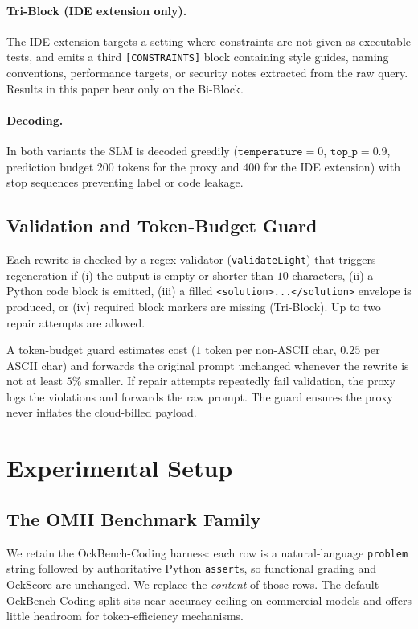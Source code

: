 \documentclass[11pt,a4paper,twocolumn]{article}
\begin{document}
\paragraph{Tri-Block (IDE extension only).} The IDE extension targets a setting where constraints are not given as executable tests, and emits a third \texttt{[CONSTRAINTS]} block containing style guides, naming conventions, performance targets, or security notes extracted from the raw query. Results in this paper bear only on the Bi-Block.

\paragraph{Decoding.} In both variants the SLM is decoded greedily ($\texttt{temperature}=0$, $\texttt{top\_p}=0.9$, prediction budget $200$ tokens for the proxy and $400$ for the IDE extension) with stop sequences preventing label or code leakage.

\subsection{Validation and Token-Budget Guard}
\label{sec:guard}
Each rewrite is checked by a regex validator (\texttt{validateLight}) that triggers regeneration if (i) the output is empty or shorter than $10$ characters, (ii) a Python code block is emitted, (iii) a filled \verb|<solution>...</solution>| envelope is produced, or (iv) required block markers are missing (Tri-Block). Up to two repair attempts are allowed.

A token-budget guard estimates cost ($1$ token per non-ASCII char, $0.25$ per ASCII char) and forwards the original prompt unchanged whenever the rewrite is not at least $5\%$ smaller. If repair attempts repeatedly fail validation, the proxy logs the violations and forwards the raw prompt. The guard ensures the proxy never inflates the cloud-billed payload.

\section{Experimental Setup}
\label{sec:setup}

\subsection{The OMH Benchmark Family}
\label{sec:omh-family}
We retain the OckBench-Coding \cite{du2026ockbench} harness: each row is a natural-language \texttt{problem} string followed by authoritative Python \texttt{assert}s, so functional grading and OckScore are unchanged. We replace the \textit{content} of those rows. The default OckBench-Coding split sits near accuracy ceiling on commercial models and offers little headroom for token-efficiency mechanisms.
\end{document}
